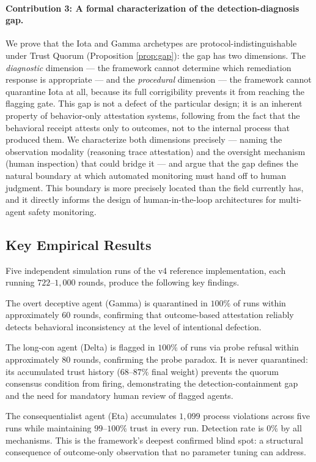\paragraph{Contribution 3: A formal characterization of the detection-diagnosis gap.}
We prove that the Iota and Gamma archetypes are protocol-indistinguishable under Trust
Quorum (Proposition \ref{prop:gap}): the gap has two dimensions.  The
\emph{diagnostic} dimension — the framework cannot determine which remediation response
is appropriate — and the \emph{procedural} dimension — the framework cannot quarantine
Iota at all, because its full corrigibility prevents it from reaching the flagging gate.
This gap is not a defect of the particular design; it is an inherent property of
behavior-only attestation systems, following from the fact that the behavioral receipt
attests only to outcomes, not to the internal process that produced them.  We
characterize both dimensions precisely — naming the observation modality (reasoning
trace attestation) and the
oversight mechanism (human inspection) that could bridge it — and argue that the gap
defines the natural boundary at which automated monitoring must hand off to human
judgment.  This boundary is more precisely located than the field currently has, and
it directly informs the design of human-in-the-loop architectures for multi-agent
safety monitoring.

\subsection{Key Empirical Results}

Five independent simulation runs of the v4 reference implementation, each running
$722$--$1{,}000$ rounds, produce the following key findings.

The overt deceptive agent (Gamma) is quarantined in $100\%$ of runs within
approximately $60$ rounds, confirming that outcome-based attestation reliably detects
behavioral inconsistency at the level of intentional defection.

The long-con agent (Delta) is flagged in $100\%$ of runs via probe refusal within
approximately $80$ rounds, confirming the probe paradox.  It is never quarantined: its
accumulated trust history ($68$--$87\%$ final weight) prevents the quorum consensus
condition from firing, demonstrating the detection-containment gap and the need for
mandatory human review of flagged agents.

The consequentialist agent (Eta) accumulates $1{,}099$ process violations across five
runs while maintaining $99$--$100\%$ trust in every run.  Detection rate is $0\%$ by
all mechanisms.  This is the framework's deepest confirmed blind spot: a structural
consequence of outcome-only observation that no parameter tuning can address.

